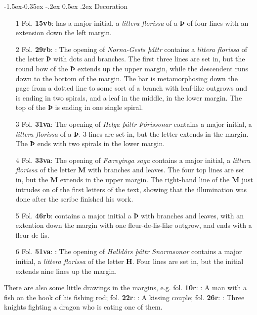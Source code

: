 \documentclass[11pt,twoside]{article}\makeatletter
\makeatletter
\renewcommand\subsubsection{\@startsection{subsubsection}{3}{\z@}%
     {-1.5ex\@plus -0.35ex \@minus -.2ex}%
     {0.5ex \@plus .2ex}%
     {\reset@font\large\sffamily}}
\makeatother
\begin{document}
\subsubsection{Decoration}
\par
\begin{itemize}
\item[1] Fol. \textbf{15vb}:  has a major initial, a \textit{littera florissa} of a {\bfseries Þ} of four lines with an extension down the left margin.
\item[2] Fol. \textbf{29rb}: : The opening of \textit{Norna-Gests þáttr} contains a \textit{littera florissa} of the letter {\bfseries Þ} with dots and branches. The first three lines are set in, but the round bow of the {\bfseries Þ} extends up the upper margin, while the descendent runs down to the bottom of the margin. The bar is metamorphosing down the page from a dotted line to some sort of a branch with leaf-like outgrows and is ending in two spirals, and a leaf in the middle, in the lower margin. The top of the {\bfseries Þ} is ending in one single spiral.
\item[3] Fol. \textbf{31va}: The opening of \textit{Helga þáttr Þórissonar} contains a major initial, a \textit{littera florissa} of a {\bfseries Þ}. 3 lines are set in, but the letter extends in the margin. The {\bfseries Þ} ends with two spirals in the lower margin.
\item[4] Fol. \textbf{33va}: The opening of \textit{Færeyinga saga} contains a major initial, a \textit{littera florissa} of the letter {\bfseries M} with branches and leaves. The four top lines are set in, but the {\bfseries M} extends in the upper margin. The right-hand line of the {\bfseries M} just intrudes on of the first letters of the text, showing that the illumination was done after the scribe finished his work.
\item[5] Fol. \textbf{46rb}: contains a major initial a {\bfseries Þ} with branches and leaves, with an extention down the margin with one fleur-de-lis-like outgrow, and ends with a fleur-de-lis.
\item[6] Fol. \textbf{51va}: : The opening of \textit{Halldórs þáttr Snorrasonar} contains a major initial, a \textit{littera florissa} of the letter {\bfseries H}. Four lines are set in, but the initial extends nine lines up the margin.
\end{itemize}  \par
There are also some little drawings in the margins, e.g. fol. \textbf{10r}: : A man with a fish on the hook of his fishing rod; fol. \textbf{22r}: : A kissing couple; fol. \textbf{26r}: : Three knights fighting a dragon who is eating one of them.\par
\end{document}
